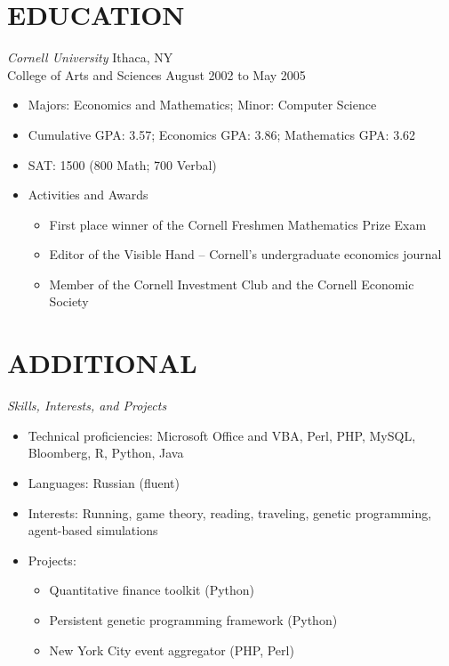 \documentclass{res}
\begin{document}
\begin{resume}
\section{EDUCATION}
\vspace{2pt}
{\sl Cornell University} \hfill Ithaca, NY \\
College of Arts and Sciences \hfill August 2002 to May 2005
 \begin{itemize} \itemsep -2pt
  \item Majors: Economics and Mathematics; Minor: Computer Science
  \item Cumulative GPA: 3.57; Economics GPA: 3.86; Mathematics GPA: 3.62
  \item SAT: 1500 (800 Math; 700 Verbal)
  \item Activities and Awards \vspace{-6pt}
    \begin{itemize} \itemsep -1pt
    \item First place winner of the Cornell Freshmen Mathematics Prize Exam
    \item Editor of the Visible Hand – Cornell’s undergraduate economics journal
    \item Member of the Cornell Investment Club and the Cornell Economic Society
    \end{itemize} \vspace{0px}
\end{itemize} \vspace{0px}

\vspace{-6pt}
\section{ADDITIONAL} 
\vspace{2pt}
{\sl Skills, Interests, and Projects}
\begin{itemize} \itemsep -2pt
  \item Technical proficiencies: Microsoft Office and VBA, Perl, PHP, MySQL, Bloomberg, R, Python, Java
  \item Languages: Russian (fluent)
  \item Interests: Running, game theory, reading, traveling, genetic programming, agent-based simulations
  \item Projects: \vspace{-6pt}
    \begin{itemize} \itemsep -2pt
    \item Quantitative finance toolkit (Python)
    \item Persistent genetic programming framework (Python)
    \item New York City event aggregator (PHP, Perl)
    \end{itemize} \vspace{0px}    
\end{itemize} \vspace{0px}

\end{resume} 
\end{document}

